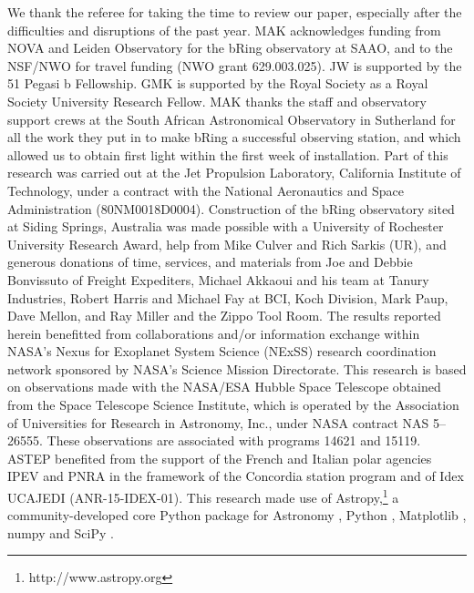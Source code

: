 \documentclass[longauth]{aa} %
\begin{document}
\begin{acknowledgements}

  We thank the referee for taking the time to review our paper, especially after the difficulties and disruptions of the past year.
  MAK acknowledges funding from NOVA and Leiden Observatory for the bRing observatory at SAAO, and to the NSF/NWO for travel funding (NWO grant 629.003.025).
  JW is supported by the 51 Pegasi b Fellowship.
GMK is supported by the Royal Society as a Royal Society University Research Fellow.
  MAK thanks the staff and observatory support crews at the South African Astronomical Observatory in Sutherland for all the work they put in to make bRing a successful observing station, and which allowed us to obtain first light within the first week of installation.
  Part of this research was carried out at the Jet Propulsion Laboratory, California Institute of Technology, under a contract with the National Aeronautics and Space Administration (80NM0018D0004).
%
Construction of the bRing observatory sited at Siding Springs, Australia was made possible with a University of Rochester University Research Award, help from Mike Culver and Rich Sarkis (UR), and generous donations of time, services, and materials from Joe and Debbie Bonvissuto of Freight Expediters, Michael Akkaoui and his team at Tanury Industries, Robert Harris and Michael Fay at BCI, Koch Division, Mark Paup, Dave Mellon, and Ray Miller and the Zippo Tool Room.
%
The results reported herein benefitted from collaborations and/or information exchange within NASA’s Nexus for Exoplanet System Science (NExSS) research coordination network sponsored by NASA’s Science Mission Directorate.
  This research is based on observations made with the NASA/ESA Hubble Space Telescope obtained from the Space Telescope Science Institute, which is operated by the Association of Universities for Research in Astronomy, Inc., under NASA contract NAS 5–26555. These observations are associated with programs 14621 and 15119.
%
ASTEP benefited from the support of the French and Italian polar agencies IPEV and PNRA in the framework of the Concordia station program and of Idex UCAJEDI (ANR-15-IDEX-01).
%
This research made use of Astropy,\footnote{http://www.astropy.org} a community-developed core Python package for Astronomy \citep{astropy:2013, astropy:2018}, Python \citep{vanRossum95,Oliphant07}, Matplotlib \citep{Hunter07,Caswell20}, 
numpy \citep{Oliphant06,vanderWalt11} and SciPy \citep{Virtanen20,Virtanen20B}.
 
\end{acknowledgements}





\newpage
\end{document}
